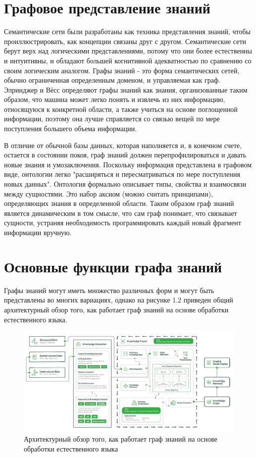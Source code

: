 \section{Графовое представление знаний}

Семантические сети были разработаны как техника представления знаний, чтобы проиллюстрировать, как концепции связаны друг с другом.
Семантические сети берут верх над логическими представлениями, потому что они более естественны и интуитивны, и обладают большей когнитивной
адекватностью по сравнению со своим логическим аналогом. Графы знаний - это форма семантических сетей, обычно ограниченная определенным
доменом, и управляемая как граф. Элринджер и Вёсс определяют графы знаний как знания, организованные таким образом, что машина может легко
понять и извлечь из них информацию, относящуюся к конкретной области, а также учиться на основе поглощенной информации, поэтому она лучше
справляется со связью вещей по мере поступления большего объема информации.

В отличие от обычной базы данных, которая наполняется и, в конечном счете, остается в состоянии покоя, граф знаний должен перепрофилироваться
и давать новые знания и умозаключения. Поскольку информация представлена в графовом виде, онтологии легко "расширяться и пересматриваться
по мере поступления новых данных". Онтология формально описывает типы, свойства и взаимосвязи между сущностями. Это набор аксиом (можно
считать принципами), определяющих знания в определенной области. Таким образом граф знаний является динамическим в том смысле, что сам граф
понимает, что связывает сущности, устраняя необходимость программировать каждый новый фрагмент информации вручную.


\section{Основные функции графа знаний}

Графы знаний могут иметь множество различных форм и могут быть представлены во многих вариациях, однако на рисунке 1.2 приведен общий
архитектурный обзор того, как работает граф знаний на основе обработки естественного языка.

\begin{figure}[ht!]
    \center
    \includegraphics [scale=0.32] {my_folder/myimg//2}
    \caption{Архитектурный обзор того, как работает граф знаний на основе обработки естественного языка}
\end{figure}

